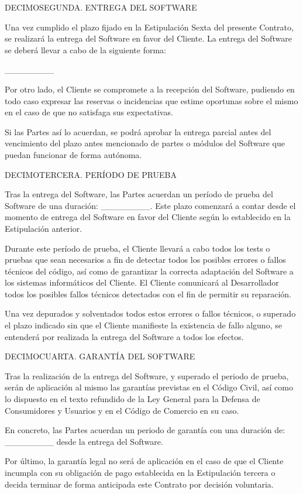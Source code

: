 \documentclass[a4paper,11pt]{report}
\begin{document}
DECIMOSEGUNDA. ENTREGA DEL SOFTWARE

Una vez cumplido el plazo fijado en la Estipulación Sexta del presente
Contrato, se realizará la entrega del Software en favor del Cliente. La
entrega del Software se deberá llevar a cabo de la siguiente forma:

\_\_\_\_\_\_\_\_

Por otro lado, el Cliente se compromete a la recepción del Software,
pudiendo en todo caso expresar las reservas o incidencias que estime
oportunas sobre el mismo en el caso de que no satisfaga sus
expectativas.

Si las Partes así lo acuerdan, se podrá aprobar la entrega parcial antes
del vencimiento del plazo antes mencionado de partes o módulos del
Software que puedan funcionar de forma autónoma.

DECIMOTERCERA. PERÍODO DE PRUEBA

Tras la entrega del Software, las Partes acuerdan un período de prueba
del Software de una duración: \_\_\_\_\_\_\_\_. Este plazo comenzará a contar
desde el momento de entrega del Software en favor del Cliente según lo
establecido en la Estipulación anterior.

Durante este período de prueba, el Cliente llevará a cabo todos los
tests o pruebas que sean necesarios a fin de detectar todos los posibles
errores o fallos técnicos del código, así como de garantizar la correcta
adaptación del Software a los sistemas informáticos del Cliente. El
Cliente comunicará al Desarrollador todos los posibles fallos técnicos
detectados con el fin de permitir su reparación.

Una vez depurados y solventados todos estos errores o fallos técnicos, o
superado el plazo indicado sin que el Cliente manifieste la existencia
de fallo alguno, se entenderá por realizada la entrega del Software a
todos los efectos.

DECIMOCUARTA. GARANTÍA DEL SOFTWARE

Tras la realización de la entrega del Software, y superado el periodo de
prueba, serán de aplicación al mismo las garantías previstas en el
Código Civil, así como lo dispuesto en el texto refundido de la Ley
General para la Defensa de Consumidores y Usuarios y en el Código de
Comercio en su caso.

En concreto, las Partes acuerdan un periodo de garantía con una duración
de: \_\_\_\_\_\_\_\_ desde la entrega del Software.

Por último, la garantía legal no será de aplicación en el caso de que el
Cliente incumpla con su obligación de pago establecida en la
Estipulación tercera o decida terminar de forma anticipada este Contrato
por decisión voluntaria.
\end{document}

